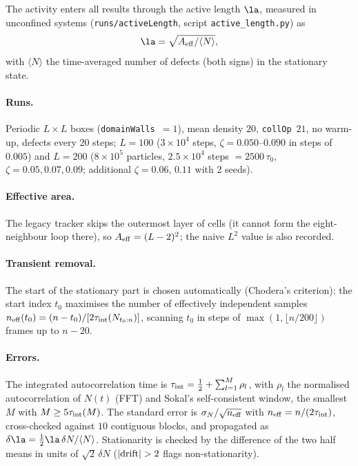 The activity enters all results through the active length $\la$, measured in unconfined systems
(\texttt{runs/activeLength}, script \texttt{active\_length.py}) as
\begin{equation}
  \la=\sqrt{A_{\rm eff}/\langle N\rangle},
  \label{eq:md-la}
\end{equation}
with $\langle N\rangle$ the time-averaged number of defects (both signs) in the stationary state.

\paragraph{Runs.} Periodic $L\times L$ boxes (\texttt{domainWalls}~$=1$), mean density $20$, \texttt{collOp}~$21$, no warm-up,
defects every $20$ steps; $L=100$ ($3\times10^4$ steps, $\zeta=0.050$--$0.090$ in steps of $0.005$) and $L=200$
($8\times10^5$ particles, $2.5\times10^4$ steps $=2500\,\tau_0$, $\zeta=0.05,0.07,0.09$; additional $\zeta=0.06$, $0.11$ with 2 seeds).

\paragraph{Effective area.} The legacy tracker skips the outermost layer of cells (it cannot form the eight-neighbour loop
there), so $A_{\rm eff}=(L-2)^2$; the naive $L^2$ value is also recorded.

\paragraph{Transient removal.} The start of the stationary part is chosen automatically (Chodera's criterion): the start index
$t_0$ maximises the number of effectively independent samples $n_{\rm eff}(t_0)=(n-t_0)/[2\tau_{\rm int}(N_{t_0:n})]$, scanning
$t_0$ in steps of $\max(1,\lfloor n/200\rfloor)$ frames up to $n-20$.

\paragraph{Errors.} The integrated autocorrelation time is $\tau_{\rm int}=\tfrac12+\sum_{l=1}^{M}\rho_l$, with $\rho_l$ the
normalised autocorrelation of $N(t)$ (FFT) and Sokal's self-consistent window, the smallest $M$ with $M\ge5\tau_{\rm int}(M)$.
The standard error is $\sigma_N/\sqrt{n_{\rm eff}}$ with $n_{\rm eff}=n/(2\tau_{\rm int})$, cross-checked against $10$ contiguous
blocks, and propagated as $\delta\la=\tfrac12\la\,\delta N/\langle N\rangle$. Stationarity is checked by the difference of the two half
means in units of $\sqrt2\,\delta N$ ($|{\rm drift}|>2$ flags non-stationarity).

